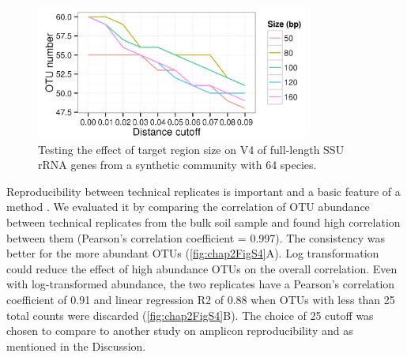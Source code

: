 \documentclass[]{msu-thesis}
\begin{document}
\label{fig:chap2FigS2}
\DoubleSpacing
\bigskip


\begin{figure}[tbph!]
  \centering
  \includegraphics[width=0.80\textwidth]{figs/chap2_figS3}
  \caption[Testing the effect of target region size on V4 of full-length SSU rRNA genes from a synthetic community]{Testing the effect of target region size on V4 of full-length SSU rRNA genes from a synthetic community with 64 species.}
  \label{fig:chap2FigS3}
\end{figure}


Reproducibility between technical replicates is important and a basic feature of a method \cite{zhou_reproducibility_2011,zhou_high-throughput_2015}. We evaluated it by comparing the correlation of OTU abundance between technical replicates from the bulk soil sample and found high correlation between them (Pearson’s correlation coefficient = 0.997). The consistency was better for the more abundant OTUs (\cref{fig:chap2FigS4}A). Log transformation could reduce the effect of high abundance OTUs on the overall correlation. Even with log-transformed abundance, the two replicates have a Pearson’s correlation coefficient of 0.91 and linear regression R2 of 0.88 when OTUs with less than 25 total counts were discarded (\cref{fig:chap2FigS4}B). The choice of 25 cutoff was chosen to compare to another study on amplicon reproducibility \cite{lundberg_defining_2012} and as mentioned in the Discussion. 
\end{document}

